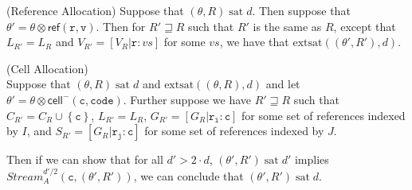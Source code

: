 \documentclass[preprint]{sigplanconf}
\newcommand{\setof}[1]{\left\{{#1}\right\}}
\newcommand{\term}[1]{\ensuremath{\mathtt{{#1}}}}
\newcommand{\Stream}{\mathit{Stream}}
\newcommand{\cellminus}[2]{\mathsf{cell}^{-}({#1}, {#2})}
\newcommand{\satisfy}[2]{{#1}\;\mathrm{sat}\;{#2}}
\newcommand{\satisfyext}[2]{\mathrm{extsat}({#1}, {#2})}
\begin{document}
\begin{lemma}{(Reference Allocation)}
Suppose that $\satisfy{(\theta, R)}{d}$. Then suppose that $\theta' =
\theta \otimes \mathsf{ref}(\term{r,v})$.  Then for $R' \sqsupseteq R$
such that $R'$ is the same as $R$, except that $L_{R'} = L_R$ and 
$V_{R'} = [V_R|\term{r}:vs]$ for some $vs$, we have that 
$\satisfyext{(\theta', R')}{d}$.
\end{lemma}


\begin{lemma}{(Cell Allocation)} \\
Suppose that $\satisfy{(\theta, R)}{d}$ and
$\satisfyext{(\theta,R)}{d}$ and let $\theta' = \theta \otimes
\cellminus{\term{c}}{\term{code}}$. Further suppose we have $R'
\sqsupseteq R$ such that $C_{R'} = C_R \cup \setof{\term{c}}$, $L_{R'}
= L_R$, $G_{R'} = [G_R | \term{r_i : c}]$ for some set of references
indexed by $I$, and $S_{R'} = [G_R | \term{r_j : c}]$ for some set of
references indexed by $J$.

Then if we can show that for all $d' > 2 \cdot d$,
$\satisfy{(\theta',R')}{d'}$ implies $\Stream^{d'/2}_A(\term{c},
(\theta', R'))$, we can conclude that $\satisfy{(\theta',R')}{d}$. 
\end{lemma}
\end{document}
